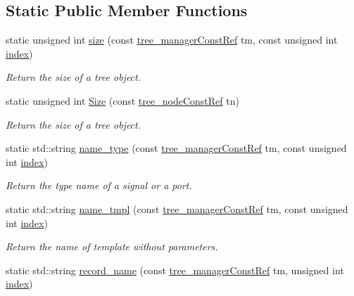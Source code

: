\subsection*{Static Public Member Functions}
\begin{DoxyCompactItemize}
\item 
static unsigned int \hyperlink{classtree__helper_a1dfdf8e77d57c307c0860c91d8c2b67d}{size} (const \hyperlink{tree__manager_8hpp_a792e3f1f892d7d997a8d8a4a12e39346}{tree\+\_\+manager\+Const\+Ref} tm, const unsigned int \hyperlink{tutorial__pact__2019_2Introduction_2third_2include_2Keccak_8h_a028c9bdc8344cca38ab522a337074797}{index})
\begin{DoxyCompactList}\small\item\em Return the size of a tree object. \end{DoxyCompactList}\item 
static unsigned int \hyperlink{classtree__helper_a3bc8327685050e3716f167a51daddc3f}{Size} (const \hyperlink{tree__node_8hpp_a3cf5d02292c940f3892425a5b5fdec3c}{tree\+\_\+node\+Const\+Ref} tn)
\begin{DoxyCompactList}\small\item\em Return the size of a tree object. \end{DoxyCompactList}\item 
static std\+::string \hyperlink{classtree__helper_aee00603ba1624687633e55453f315687}{name\+\_\+type} (const \hyperlink{tree__manager_8hpp_a792e3f1f892d7d997a8d8a4a12e39346}{tree\+\_\+manager\+Const\+Ref} tm, const unsigned int \hyperlink{tutorial__pact__2019_2Introduction_2third_2include_2Keccak_8h_a028c9bdc8344cca38ab522a337074797}{index})
\begin{DoxyCompactList}\small\item\em Return the type name of a signal or a port. \end{DoxyCompactList}\item 
static std\+::string \hyperlink{classtree__helper_a8bf8008c24c142ff7aba3b4cbaa43f66}{name\+\_\+tmpl} (const \hyperlink{tree__manager_8hpp_a792e3f1f892d7d997a8d8a4a12e39346}{tree\+\_\+manager\+Const\+Ref} tm, const unsigned int \hyperlink{tutorial__pact__2019_2Introduction_2third_2include_2Keccak_8h_a028c9bdc8344cca38ab522a337074797}{index})
\begin{DoxyCompactList}\small\item\em Return the name of template without parameters. \end{DoxyCompactList}\item 
static std\+::string \hyperlink{classtree__helper_a320dc61da70090a5f995c49625c1dcca}{record\+\_\+name} (const \hyperlink{tree__manager_8hpp_a792e3f1f892d7d997a8d8a4a12e39346}{tree\+\_\+manager\+Const\+Ref} tm, unsigned int \hyperlink{tutorial__pact__2019_2Introduction_2third_2include_2Keccak_8h_a028c9bdc8344cca38ab522a337074797}{index})

\end{DoxyCompactItemize}
